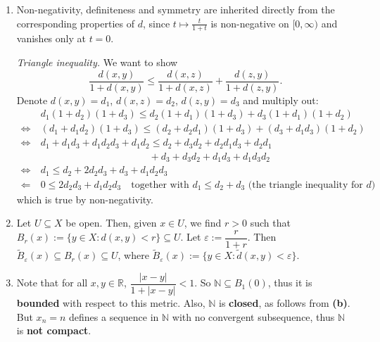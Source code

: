 \begin{exercisesolution}
\begin{enumerate}[label=\textbf{(\alph*)}]
  \item Non-negativity, definiteness and symmetry are inherited directly from the
    corresponding properties of $d$, since $t \mapsto \tfrac{t}{1+t}$ is non-negative on
    $[0,\infty)$ and vanishes only at $t=0$.

    \textit{Triangle inequality.} We want to show
    \[
    \frac{d(x,y)}{1+d(x,y)} \leq \frac{d(x,z)}{1+d(x,z)} + \frac{d(z,y)}{1+d(z,y)}.
    \]
    Denote $d(x,y) = d_1$, $d(x,z) = d_2$, $d(z,y) = d_3$ and multiply out:
    \[
    \begin{aligned}
    &d_1(1+d_2)(1+d_3) \leq d_2(1+d_1)(1+d_3) + d_3(1+d_1)(1+d_2) \\
    \iff\ & (d_1 + d_1d_2)(1+d_3) \leq (d_2 + d_2d_1)(1+d_3) + (d_3 + d_1d_3)(1+d_2) \\
    \iff\ & d_1 + d_1d_3 + d_1d_2d_3 + d_1d_2 \leq d_2 + d_3d_2 + d_2d_1d_3 + d_2d_1 \\
    & \qquad\qquad\qquad\qquad\qquad\quad + d_3 + d_3d_2 + d_1d_3 + d_1d_3d_2 \\
    \iff\ & d_1 \leq d_2 + 2d_2d_3 + d_3 + d_1d_2d_3 \\
    \Longleftarrow\ & 0 \leq 2d_2d_3 + d_1d_2d_3 \quad \text{together with } d_1 \leq d_2+d_3
      \text{ (the triangle inequality for } d\text{)}
    \end{aligned}
    \]
    which is true by non-negativity.
  \item Let $U \subseteq X$ be open. Then, given $x \in U$, we find $r > 0$ such that
    $B_r(x) := \{y \in X : d(x,y) < r\} \subseteq U$. Let $\varepsilon := \dfrac{r}{1+r}$. Then
    $\tilde B_\varepsilon(x) \subseteq B_r(x) \subseteq U$, where
    $\tilde B_\varepsilon(x) := \{y \in X : \tilde d(x,y) < \varepsilon\}$.
  \item Note that for all $x, y \in \mathbb{R}$, $\dfrac{|x-y|}{1+|x-y|} < 1$. So
    $\mathbb{N} \subseteq B_1(0)$, thus it is \textbf{bounded} with respect to this metric. Also,
    $\mathbb{N}$ is \textbf{closed}, as follows from \textbf{(b)}. But $x_n = n$ defines a
    sequence in $\mathbb{N}$ with no convergent subsequence, thus $\mathbb{N}$ is \textbf{not
    compact}.
\end{enumerate}
\end{exercisesolution}

